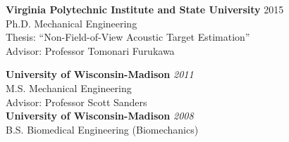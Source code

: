 \documentclass[10pt,letterpaper]{article}
\begin{document}
\begin{center}
\begin{minipage}{0.55\columnwidth}
{\bf Virginia Polytechnic Institute and State University}\hspace{1mm} 2015\\
\hspace{2mm}Ph.D.  Mechanical Engineering  \\ 
\hspace{4mm} Thesis: ``Non-Field-of-View Acoustic Target Estimation''\\
\hspace{28mm} Advisor: Professor Tomonari Furukawa
\end{minipage}
\hfill
\begin{minipage}{0.44\columnwidth}
{\bf University of Wisconsin-Madison} \hfill {\em2011} \\ 
\hspace{5mm} M.S. Mechanical Engineering \\
\hspace{10mm} Advisor: Professor Scott Sanders\\
{\bf University of Wisconsin-Madison} \hfill {\em2008} \\ 
\hspace{5mm}B.S. Biomedical Engineering (Biomechanics)
\end{minipage}
\end{center}
\vspace{-8mm}
\end{document}
